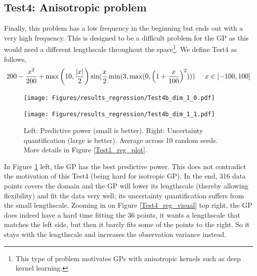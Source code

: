 \subsection{Test4: Anisotropic problem}
Finally, this problem has a low frequency in the beginning but ends out with a very high frequency.
This is designed to be a difficult problem for the GP as this would need a different lengthscale
throughout the space\footnote{This type of problem motivates GPs with anisotropic kernels such as deep
kernel learning\cite{DeepKernelLearning}.}. We define Test4 as follows, 
$$200 - \frac{x^2}{200} + \max\left(10, \frac{|x|}{2}\right) \sin(\frac{x}{2} \min(3, \max(0, \left(1 + \frac{x}{100}\right)^2))) \hspace{0.5cm} x \in [-100,100]$$

\begin{figure}[H]
  \centering
  \begin{minipage}[b]{0.49\textwidth}
   \texttt{[image: Figures/results\_regression/Test4b\_dim\_1\_0.pdf]}
  \end{minipage}
  \hfill
  \begin{minipage}[b]{0.49\textwidth}
    \texttt{[image: Figures/results\_regression/Test4b\_dim\_1\_1.pdf]}
   \end{minipage}
  \caption{Left: Predictive power (small is better). Right: Uncertainty quantification (large is
  better). Average across 10 random seeds. More details in Figure \ref{Test1_reg_plot}.}
  \label{Test4_reg_plot}
\end{figure}

In Figure \ref{Test4_reg_plot} left, the GP has the best predictive power. This does not contradict
the motivation of this Test4 (being hard for isotropic GP). In the end, 316 data points covers
the domain and the GP will lower its lengthscale (thereby allowing flexibility) and fit the data very
well; its uncertainty quantification suffers from the small lengthscale. %
Zooming in on Figure \ref{Test4_reg_visual} top right, the GP does indeed have a hard
time fitting the 36 points, it wants a lengthscale that matches the left side, but then it barely
fits some of the points to the right. So it stays with the lengthscale and increases the observation
variance instead. 



